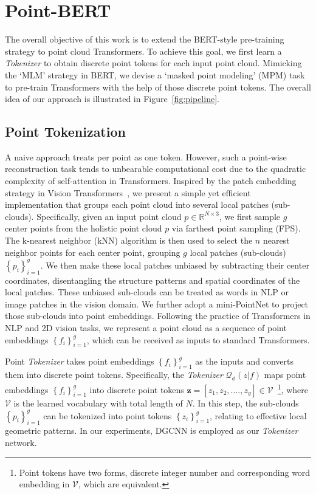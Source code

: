 \section{Point-BERT}
\label{sec:app}
	
The overall objective of this work is to extend the BERT-style pre-training strategy to point cloud Transformers.	To achieve this goal, we first learn a  \textit{Tokenizer} to obtain discrete point tokens for each input point cloud.  Mimicking the `MLM' strategy in BERT\cite{bert}, we devise a `masked point modeling' (MPM) task to pre-train Transformers with the help of those discrete point tokens. The overall idea of our approach is illustrated in Figure~\ref{fig:pipeline}. 

	
\subsection{Point Tokenization} \label{p:dvae}

A naive approach treats per point as one token. However, such a point-wise reconstruction task tends to unbearable computational cost due to the quadratic complexity of self-attention in Transformers. Inspired by the patch embedding strategy in Vision Transformers~\cite{vit}, we present a simple yet efficient implementation that groups each point cloud into several local patches (sub-clouds). Specifically, given an input point cloud $ p\in \mathbb{R}^{N\times 3}$, we first sample $g$ center points from the holistic point cloud $ p$ via farthest point sampling (FPS). The k-nearest neighbor (kNN) algorithm is then used to select the $n$ nearest neighbor points for each center point, grouping $g$ local patches (sub-clouds) $\left \{  p_{i} \right \}_{i=1}^{g}$.  We then make these local patches unbiased by subtracting their center coordinates, disentangling the structure patterns and spatial coordinates of the local patches. These unbiased sub-clouds can be treated as words in NLP or image patches in the vision domain. We further adopt a mini-PointNet\cite{pointnet} to project those sub-clouds into point embeddings. Following the practice of Transformers in NLP and 2D vision tasks, we represent a point cloud as a sequence of point embeddings $\left \{  f_{i} \right \}_{i=1}^{g}$, which can be received as inputs to standard Transformers.

Point \textit{Tokenizer}  takes point embeddings $\left \{  f_{i} \right \}_{i=1}^{g}$ as the inputs and converts them into discrete point tokens. Specifically, the \textit{Tokenizer} $\mathcal{Q}_{\phi}(z|f)$  maps point embeddings $\left \{  f_{i} \right \}_{i=1}^{g}$ into discrete point tokens $\mathbf{z}=[z_{1},z_{2},....,z_{g}] \in \mathcal{V} $~\footnote{Point tokens have two forms, discrete integer number and corresponding word embedding in $\mathcal{V}$, which are equivalent.}, where $\mathcal{V}$ is the learned vocabulary with total length of $N$. In this step, the sub-clouds  $\left \{  p_{i} \right \}_{i=1}^{g}$ can be tokenized into  point tokens $\left \{  z_{i} \right \}_{i=1}^{g}$, relating to  effective local geometric patterns. In our experiments, DGCNN\cite{wang2019dynamic} is employed as our \textit{Tokenizer} network.
	

